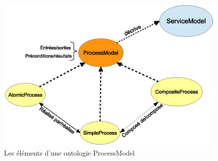 \begin{figure}[h]
    \centering
    \includegraphics[width=1\textwidth]{figs/owls-ProcessModel.eps}
    \caption{Les éléments d'une ontologie ProcessModel}
    \label{fig:owls-ProcessModel}
\end{figure}
